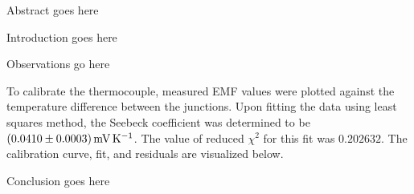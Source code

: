 
\physics

\begin{paperabs}
	
	Abstract goes here
	
\end{paperabs}

\begin{paper}
	

	Introduction goes here
	

	Observations go here
		
	
	To calibrate the thermocouple, measured EMF values were plotted against the temperature difference between the junctions. Upon fitting the data using least squares method, the Seebeck coefficient was determined to be \( \left(0.0410 \pm 0.0003\right) \si{\milli\volt\per\kelvin} \). The value of reduced \( \chi ^2 \) for this fit was \( 0.202632 \). The calibration curve, fit, and residuals are visualized below. 
	
	

	Conclusion goes here



\end{paper}

